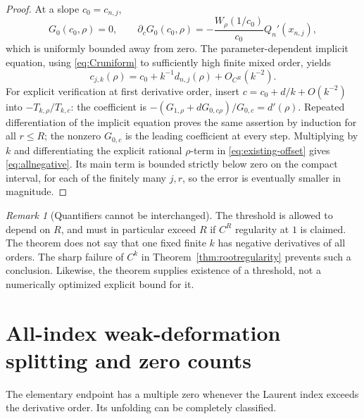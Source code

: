 \documentclass[11pt,letterpaper]{article}
\numberwithin{equation}{section}
\theoremstyle{definition}\newtheorem{definition}[theorem]{Definition}
\theoremstyle{remark}\newtheorem{remark}[theorem]{Remark}
\begin{document}
\begin{proof}
At a slope $c_0=c_{n,j}$,
\[
 G_0(c_0,\rho)=0,\qquad
 \partial_cG_0(c_0,\rho)
 =-\frac{W_\rho(1/c_0)}{c_0}Q_n'(x_{n,j}),
\]
which is uniformly bounded away from zero. The parameter-dependent implicit equation, using \eqref{eq:Cruniform} to sufficiently high finite mixed order, yields
\[
 c_{j,k}(\rho)=c_0+k^{-1}d_{n,j}(\rho)+O_{C^R}(k^{-2}).
\]
For explicit verification at first derivative order, insert $c=c_0+d/k+O(k^{-2})$ into $-T_{k,\rho}/T_{k,c}$: the coefficient is
$-(G_{1,\rho}+dG_{0,c\rho})/G_{0,c}=d'(\rho)$. Repeated differentiation of the implicit equation proves the same assertion by induction for all $r\le R$; the nonzero $G_{0,c}$ is the leading coefficient at every step. Multiplying by $k$ and differentiating the explicit rational $\rho$-term in \eqref{eq:existing-offset} gives \eqref{eq:allnegative}. Its main term is bounded strictly below zero on the compact interval, for each of the finitely many $j,r$, so the error is eventually smaller in magnitude.
\end{proof}

\begin{remark}[Quantifiers cannot be interchanged]
The threshold is allowed to depend on $R$, and must in particular exceed $R$ if $C^R$ regularity at $1$ is claimed. The theorem does not say that one fixed finite $k$ has negative derivatives of all orders. The sharp failure of $C^k$ in Theorem~\ref{thm:rootregularity} prevents such a conclusion. Likewise, the theorem supplies existence of a threshold, not a numerically optimized explicit bound for it.
\end{remark}

\section{All-index weak-deformation splitting and zero counts}\label{sec:weak}
The elementary endpoint has a multiple zero whenever the Laurent index exceeds the derivative order. Its unfolding can be completely classified.
\end{document}
